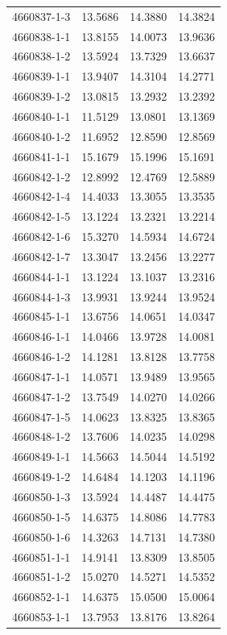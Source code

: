 \begin{longtable}{lrrr}
4660837-1-3 & 13.5686 & 14.3880 & 14.3824 \\
4660838-1-1 & 13.8155 & 14.0073 & 13.9636 \\
4660838-1-2 & 13.5924 & 13.7329 & 13.6637 \\
4660839-1-1 & 13.9407 & 14.3104 & 14.2771 \\
4660839-1-2 & 13.0815 & 13.2932 & 13.2392 \\
4660840-1-1 & 11.5129 & 13.0801 & 13.1369 \\
4660840-1-2 & 11.6952 & 12.8590 & 12.8569 \\
4660841-1-1 & 15.1679 & 15.1996 & 15.1691 \\
4660842-1-2 & 12.8992 & 12.4769 & 12.5889 \\
4660842-1-4 & 14.4033 & 13.3055 & 13.3535 \\
4660842-1-5 & 13.1224 & 13.2321 & 13.2214 \\
4660842-1-6 & 15.3270 & 14.5934 & 14.6724 \\
4660842-1-7 & 13.3047 & 13.2456 & 13.2277 \\
4660844-1-1 & 13.1224 & 13.1037 & 13.2316 \\
4660844-1-3 & 13.9931 & 13.9244 & 13.9524 \\
4660845-1-1 & 13.6756 & 14.0651 & 14.0347 \\
4660846-1-1 & 14.0466 & 13.9728 & 14.0081 \\
4660846-1-2 & 14.1281 & 13.8128 & 13.7758 \\
4660847-1-1 & 14.0571 & 13.9489 & 13.9565 \\
4660847-1-2 & 13.7549 & 14.0270 & 14.0266 \\
4660847-1-5 & 14.0623 & 13.8325 & 13.8365 \\
4660848-1-2 & 13.7606 & 14.0235 & 14.0298 \\
4660849-1-1 & 14.5663 & 14.5044 & 14.5192 \\
4660849-1-2 & 14.6484 & 14.1203 & 14.1196 \\
4660850-1-3 & 13.5924 & 14.4487 & 14.4475 \\
4660850-1-5 & 14.6375 & 14.8086 & 14.7783 \\
4660850-1-6 & 14.3263 & 14.7131 & 14.7380 \\
4660851-1-1 & 14.9141 & 13.8309 & 13.8505 \\
4660851-1-2 & 15.0270 & 14.5271 & 14.5352 \\
4660852-1-1 & 14.6375 & 15.0500 & 15.0064 \\
4660853-1-1 & 13.7953 & 13.8176 & 13.8264 \\

\end{longtable}
